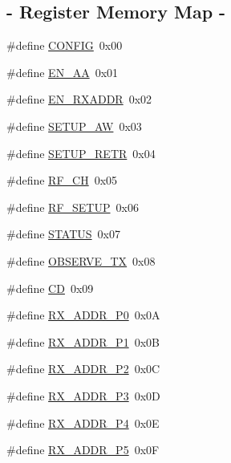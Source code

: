 \subsection*{-\/ Register Memory Map -\/}
\begin{DoxyCompactItemize}
\item 
\#define \hyperlink{group__nordic__hal__nrf__reg_ga76ea3cf49247a07c54b3db005a3c7f57}{CONFIG}~0x00
\item 
\#define \hyperlink{group__nordic__hal__nrf__reg_gaa84a282351a2c9b83dd653df6ac59216}{EN\_\-AA}~0x01
\item 
\#define \hyperlink{group__nordic__hal__nrf__reg_gab6b2378ce9cab6ccafb6d30c774c5307}{EN\_\-RXADDR}~0x02
\item 
\#define \hyperlink{group__nordic__hal__nrf__reg_gaf5ef355ba3eca336db1285cab353ddc2}{SETUP\_\-AW}~0x03
\item 
\#define \hyperlink{group__nordic__hal__nrf__reg_ga2188309b3eceeae158dd64109cd919aa}{SETUP\_\-RETR}~0x04
\item 
\#define \hyperlink{group__nordic__hal__nrf__reg_ga5c4da84e4a01531aa9f5c3e617848d66}{RF\_\-CH}~0x05
\item 
\#define \hyperlink{group__nordic__hal__nrf__reg_gad95edb7665f39454d7d7fd436301712b}{RF\_\-SETUP}~0x06
\item 
\#define \hyperlink{group__nordic__hal__nrf__reg_ga59279bee44f34d08b3cbf3a89fb0d8d9}{STATUS}~0x07
\item 
\#define \hyperlink{group__nordic__hal__nrf__reg_ga491468eaa7f2db84c152709b0b5fb1aa}{OBSERVE\_\-TX}~0x08
\item 
\#define \hyperlink{group__nordic__hal__nrf__reg_ga1050140a3d78b059f809a424e0d9e1c7}{CD}~0x09
\item 
\#define \hyperlink{group__nordic__hal__nrf__reg_gadc82a1b0dee303d8b783b9b9a89ae5aa}{RX\_\-ADDR\_\-P0}~0x0A
\item 
\#define \hyperlink{group__nordic__hal__nrf__reg_gad4b44f18e4b27b07af84783d8f11726d}{RX\_\-ADDR\_\-P1}~0x0B
\item 
\#define \hyperlink{group__nordic__hal__nrf__reg_gac10ad4b1d3ace06cc269098d1863f411}{RX\_\-ADDR\_\-P2}~0x0C
\item 
\#define \hyperlink{group__nordic__hal__nrf__reg_ga01228e7b997954bc9d715c8289731181}{RX\_\-ADDR\_\-P3}~0x0D
\item 
\#define \hyperlink{group__nordic__hal__nrf__reg_gafc579afe21136cd3f72b3ac805086726}{RX\_\-ADDR\_\-P4}~0x0E
\item 
\#define \hyperlink{group__nordic__hal__nrf__reg_ga49dfc07335896551e8c7797594658b07}{RX\_\-ADDR\_\-P5}~0x0F

\end{DoxyCompactItemize}
